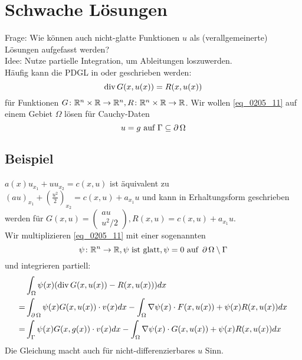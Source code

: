 \section{Schwache Lösungen}
\label{sec:para6}
Frage: Wie können auch nicht-glatte Funktionen $u$ als (verallgemeinerte) Lösungen aufgefasst werden?  \\
Idee: Nutze partielle Integration, um Ableitungen loszuwerden.\\
Häufig kann die PDGL in  oder  geschrieben werden:
\begin{equation}
	\operatorname{div} G(x,u(x)) = R(x,u(x)) \label{eq_0205_11}
\end{equation}
für Funktionen $G\colon \mathbb{R}^n \times \mathbb{R} \rightarrow \mathbb{R}^n, R\colon \mathbb{R}^n \times \mathbb{R} \rightarrow \mathbb{R}$. Wir wollen \eqref{eq_0205_11} auf einem Gebiet $\Omega$ lösen für Cauchy-Daten
\[u = g \text{ auf } \Gamma \subseteq \operatorname{\partial} \Omega \]

\subsection{Beispiel}
\label{bsp_15}
	$a(x)u_{x_1} + u u_{x_2} = c(x,u)$ ist äquivalent \marginnote{[15]} zu $(au)_{x_1} + \left( \frac{u^2}{2} \right)_{x_2} = c(x,u) + a_{x_1} u$ und kann in Erhaltungsform geschrieben werden für $G(x,u) = \begin{pmatrix} au \\ u^2/2 \end{pmatrix}, R(x,u) = c(x,u) + a_{x_1} u$. \\
	Wir multiplizieren \eqref{eq_0205_11} mit einer sogenannten 
	\[ \psi \colon \mathbb{R}^n \rightarrow \mathbb{R}, \psi \text{ ist glatt}, \psi = 0 \text{ auf } \operatorname{\partial} \Omega \setminus \Gamma \]
	und integrieren partiell:
	\begin{equation}
	\begin{aligned}
		&\int_\Omega \psi(x) (\operatorname{div} G(x,u(x)) - R(x,u(x))) dx \\ \notag
		= &\int_{\operatorname{\partial} \Omega} \psi(x) G(x,u(x)) \cdot v(x) dx - \int_\Omega \nabla \psi(x) \cdot F(x,u(x)) + \psi(x) R(x,u(x)) dx \\
		= &\int_\Gamma \psi(x) G(x,g(x)) \cdot v(x) dx - \int_\Omega \nabla \psi(x) \cdot G(x,u(x)) + \psi(x) R(x,u(x)) dx
	\end{aligned}
	\end{equation}
	Die Gleichung macht auch für nicht-differenzierbares $u$ Sinn.


